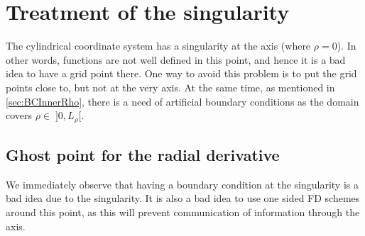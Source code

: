\section{Treatment of the singularity}
\label{sec:innerCenter}
The cylindrical coordinate system has a singularity at the axis (where $\rho=0$).
In other words, functions are not well defined in this point, and hence it is a bad idea to have a grid point there.
One way to avoid this problem is to put the grid points close to, but not at the very axis.
At the same time, as mentioned in \cref{sec:BCInnerRho}, there is a need of artificial boundary conditions as the domain covers $\rho \in \;]0, L_\rho[$.

\subsection{Ghost point for the radial derivative}
\label{sec:ghostRhoDeriv}
We immediately observe that having a boundary condition at the singularity is a bad idea due to the singularity.
It is also a bad idea to use one sided FD schemes around this point, as this will prevent communication of information through the axis.

